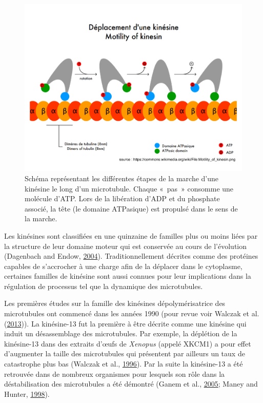 \documentclass[12pt,a4paper,twoside,openright]{book}
\begin{document}
\begin{figure}[htbp]
\centering
\includegraphics{figures/intro/motility_kinesin.png}
\caption[Schéma représentant les différentes étapes de la marche d'une kinésine le long d'un microtubule.]{\label{fig:motility_kinesin}Schéma
représentant les différentes étapes de la marche d'une kinésine le long
d'un microtubule. Chaque «~pas~» consomme une molécule d'ATP. Lors de la
libération d'ADP et du phosphate associé, la tête (le domaine ATPasique)
est propulsé dans le sens de la marche.}
\end{figure}

Les kinésines sont classifiées en une quinzaine de familles plus ou
moins liées par la structure de leur domaine moteur qui est conservée au
cours de l'évolution (Dagenbach and Endow,
\protect\hyperlink{ref-Dagenbach2004}{2004}). Traditionnellement
décrites comme des protéines capables de s'accrocher à une charge afin
de la déplacer dans le cytoplasme, certaines familles de kinésine sont
aussi connues pour leur implications dans la régulation de processus tel
que la dynamique des microtubules.

Les premières études sur la famille des kinésines dépolymérisatrice des
microtubules ont commencé dans les années 1990 (pour revue voir Walczak
et al. (\protect\hyperlink{ref-Walczak2013a}{2013})). La kinésine-13 fut
la première à être décrite comme une kinésine qui induit un
désassemblage des microtubules. Par exemple, la déplétion de la
kinésine-13 dans des extraits d'œufs de \emph{Xenopus} (appelé XKCM1) a
pour effet d'augmenter la taille des microtubules qui présentent par
ailleurs un taux de catastrophe plus bas (Walczak et al.,
\protect\hyperlink{ref-Walczak1996}{1996}). Par la suite la kinésine-13
a été retrouvée dans de nombreux organismes pour lesquels son rôle dans
la déstabilisation des microtubules a été démontré (Ganem et al.,
\protect\hyperlink{ref-Ganem2005}{2005}; Maney and Hunter,
\protect\hyperlink{ref-Maney1998}{1998}).
\end{document}

